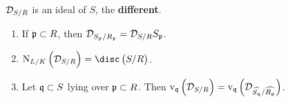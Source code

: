\begin{definition*}
$ \mathcal{D}_{S / R} $ is an ideal of $ S $, the \textbf{different}.
\end{definition*}

\begin{proposition}
\label{prop:3.8}
\hfill
\begin{enumerate}
\item If $ \mathfrak{p} \subset R $, then $ \mathcal{D}_{S_{\mathfrak{p}} / R_{\mathfrak{p}}} = \mathcal{D}_{S / R}S_{\mathfrak{p}} $.
\item $ \N_{L / K}\br{\DDD_{S / R}} = \disc\br{S / R} $.
\item Let $ \mathfrak{q} \subset S $ lying over $ \mathfrak{p} \subset R $. Then $ \v_\qqq\br{\DDD_{S / R}} = \v_\qqq\br{\DDD_{\widehat{S_\qqq} / \widehat{R_\ppp}}} $.
\end{enumerate}
\end{proposition}

